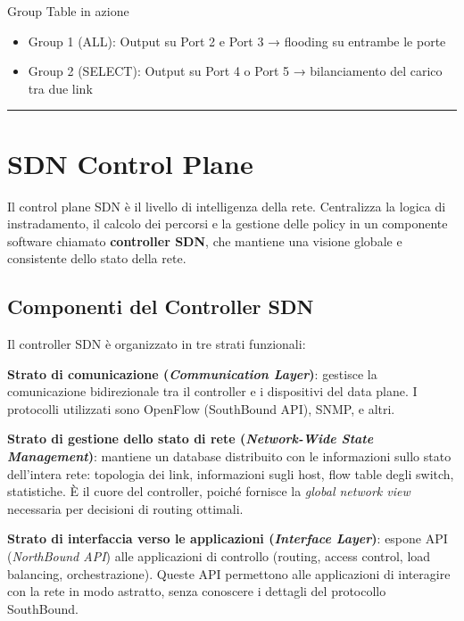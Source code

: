 \documentclass[
  italian,
  openany]{book}
\providecommand{\tightlist}{%
  \setlength{\itemsep}{0pt}\setlength{\parskip}{0pt}}
\begin{document}
\begin{callouttip}{Group Table in azione}

\begin{itemize}
\tightlist
\item
  Group 1 (ALL): Output su Port 2 e Port 3 → flooding su entrambe le
  porte
\item
  Group 2 (SELECT): Output su Port 4 o Port 5 → bilanciamento del carico
  tra due link
\end{itemize}

\end{callouttip}

\begin{center}\rule{0.5\linewidth}{0.5pt}\end{center}

\section{SDN Control Plane}\label{sdn-control-plane}

Il control plane SDN è il livello di intelligenza della rete.
Centralizza la logica di instradamento, il calcolo dei percorsi e la
gestione delle policy in un componente software chiamato
\textbf{controller SDN}, che mantiene una visione globale e consistente
dello stato della rete.

\subsection{Componenti del Controller
SDN}\label{componenti-del-controller-sdn}

Il controller SDN è organizzato in tre strati funzionali:

\textbf{Strato di comunicazione (\emph{Communication Layer})}: gestisce
la comunicazione bidirezionale tra il controller e i dispositivi del
data plane. I protocolli utilizzati sono OpenFlow (SouthBound API),
SNMP, e altri.

\textbf{Strato di gestione dello stato di rete (\emph{Network-Wide State
Management})}: mantiene un database distribuito con le informazioni
sullo stato dell'intera rete: topologia dei link, informazioni sugli
host, flow table degli switch, statistiche. È il cuore del controller,
poiché fornisce la \emph{global network view} necessaria per decisioni
di routing ottimali.

\textbf{Strato di interfaccia verso le applicazioni (\emph{Interface
Layer})}: espone API (\emph{NorthBound API}) alle applicazioni di
controllo (routing, access control, load balancing, orchestrazione).
Queste API permettono alle applicazioni di interagire con la rete in
modo astratto, senza conoscere i dettagli del protocollo SouthBound.
\end{document}
